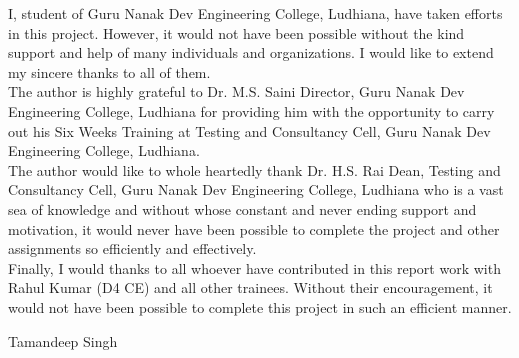 \begin{Large}
\end{Large}

I, student of Guru Nanak Dev Engineering College, Ludhiana, have taken efforts in this project.
However, it would not have been possible without the kind support and help of many individuals
and organizations. I would like to extend my sincere thanks to all of them.\\

The author is highly grateful to Dr. M.S. Saini Director, Guru Nanak Dev Engineering College, Ludhiana for providing him with the opportunity to carry out his Six Weeks Training at
Testing and Consultancy Cell, Guru Nanak Dev Engineering College, Ludhiana.\\

The author would like to whole heartedly thank Dr. H.S. Rai Dean, Testing and Consultancy
Cell, Guru Nanak Dev Engineering College, Ludhiana who is a vast sea of knowledge and without whose constant and never ending support and motivation, it would never have been possible to complete the project and other assignments so efficiently and effectively.\\

Finally, I would thanks to all whoever have contributed in
this report work with Rahul Kumar (D4 CE) and all other trainees. Without their 
encouragement, it would not have been possible to complete this project
in such an efficient manner.





\vskip 1.0cm 
\noindent Tamandeep Singh
